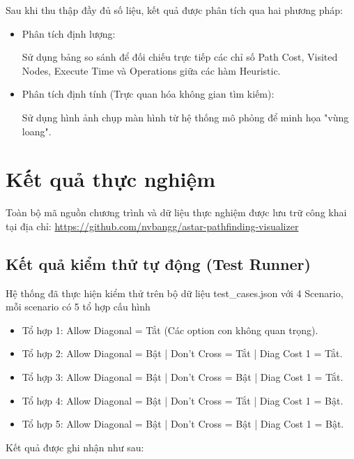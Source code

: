 \documentclass[12pt,a4paper]{report}
\begin{document}
Sau khi thu thập đầy đủ số liệu, kết quả được phân tích qua hai phương pháp:
\begin{itemize}
    

\item Phân tích định lượng:

Sử dụng bảng so sánh để đối chiếu trực tiếp các chỉ số Path Cost, Visited Nodes, Execute Time và Operations giữa các hàm Heuristic.

\item Phân tích định tính (Trực quan hóa không gian tìm kiếm):

Sử dụng hình ảnh chụp màn hình từ hệ thống mô phỏng để minh họa "vùng loang".
\end{itemize}
 
\section{Kết quả thực nghiệm}
Toàn bộ mã nguồn chương trình và dữ liệu thực nghiệm được lưu trữ công khai tại địa chỉ: \url{https://github.com/nvbangg/astar-pathfinding-visualizer}


\subsection{Kết quả kiểm thử tự động (Test Runner)}

Hệ thống đã thực hiện kiểm thử trên bộ dữ liệu test\_cases.json với 4 Scenario, mỗi scenario có 5 tổ hợp cấu hình

\begin{itemize}
    \item Tổ hợp 1: Allow Diagonal = Tắt (Các option con không quan trọng).
    \item Tổ hợp 2: Allow Diagonal = Bật | Don't Cross = Tắt | Diag Cost 1 = Tắt.
    \item Tổ hợp 3: Allow Diagonal = Bật | Don't Cross = Bật | Diag Cost 1 = Tắt.
    \item Tổ hợp 4: Allow Diagonal = Bật | Don't Cross = Tắt | Diag Cost 1 = Bật.
    \item Tổ hợp 5: Allow Diagonal = Bật | Don't Cross = Bật | Diag Cost 1 = Bật.
\end{itemize}
Kết quả được ghi nhận như sau:
\end{document}
